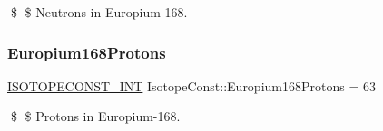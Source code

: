 \$ \$ Neutrons in Europium-\/168. \mbox{\label{group___isotope_const-_europium-_eu168_gab258c748af3434c676b278e7117ef149}} 
\subsubsection{\texorpdfstring{Europium168\+Protons}{Europium168Protons}}
{\footnotesize\ttfamily \mbox{\hyperlink{group___isotope_const-_macros_ga5f18360b3e99483a35c32d789e62621c}{I\+S\+O\+T\+O\+P\+E\+C\+O\+N\+S\+T\+\_\+\+I\+NT}} Isotope\+Const\+::\+Europium168\+Protons = 63}

\$ \$ Protons in Europium-\/168. 